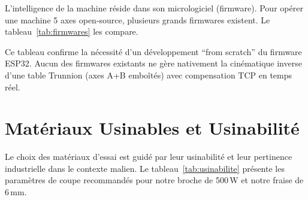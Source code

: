 L'intelligence de la machine réside dans son micrologiciel (firmware). Pour opérer une machine 5 axes open-source, plusieurs grands firmwares existent. Le tableau~\ref{tab:firmwares} les compare.

\begin{table}[htbp]
\centering
\renewcommand{\arraystretch}{1.3}
\caption{Comparatif des firmwares CNC open-source pour machine 5 axes}
\label{tab:firmwares}
\end{table}

Ce tableau confirme la nécessité d'un développement ``from scratch'' du firmware ESP32. Aucun des firmwares existants ne gère nativement la cinématique inverse d'une table Trunnion (axes A+B emboîtés) avec compensation TCP en temps réel.

\section{Matériaux Usinables et Usinabilité}

Le choix des matériaux d'essai est guidé par leur usinabilité et leur pertinence industrielle dans le contexte malien. Le tableau~\ref{tab:usinabilite} présente les paramètres de coupe recommandés pour notre broche de 500\,W et notre fraise de $6\,\text{mm}$.

